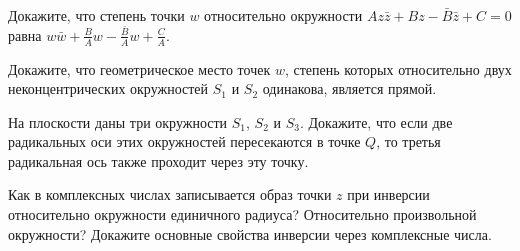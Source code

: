 \documentclass[a4paper, 12pt, num=23, date=09.10.2019]{listok}
\begin{document}
\begin{problem}
	Докажите, что степень точки $w$ относительно окружности $Az\bar z + Bz - \bar B \bar z + C = 0$ равна
	$w\bar w + \frac B A w - \frac{\bar B}A w + \frac C A$.
\end{problem}
\begin{problem}
	Докажите, что геометрическое место точек $w$, степень которых относительно двух неконцентрических окружностей $S_1$ и $S_2$ одинакова, является прямой.
\end{problem}
\begin{problem}
	На плоскости даны три окружности $S_1$, $S_2$ и $S_3$.
	Докажите, что если две радикальных оси этих окружностей пересекаются в точке $Q$, то третья радикальная ось также проходит через эту точку.
\end{problem}
\begin{problem}
	Как в комплексных числах записывается образ точки $z$ при инверсии относительно окружности единичного радиуса?
	Относительно произвольной окружности? Докажите основные свойства инверсии через комплексные числа.
\end{problem}
\end{document}
